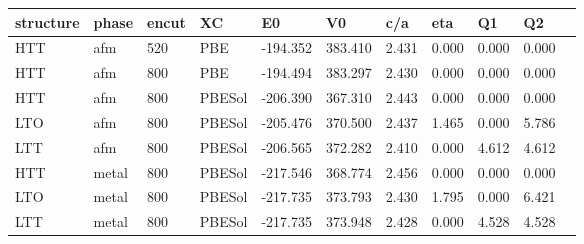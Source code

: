 \begin{tabular}{lllllllllll}
\toprule
structure &  phase & encut &      XC &       E0 &       V0 &    c/a &    eta &     Q1 &     Q2 \\
\midrule
      HTT &    afm &   520 &     PBE & -194.352 &  383.410 &  2.431 &  0.000 &  0.000 &  0.000 \\
      HTT &    afm &   800 &     PBE & -194.494 &  383.297 &  2.430 &  0.000 &  0.000 &  0.000 \\
      HTT &    afm &   800 &  PBESol & -206.390 &  367.310 &  2.443 &  0.000 &  0.000 &  0.000 \\
      LTO &    afm &   800 &  PBESol & -205.476 &  370.500 &  2.437 &  1.465 &  0.000 &  5.786 \\
      LTT &    afm &   800 &  PBESol & -206.565 &  372.282 &  2.410 &  0.000 &  4.612 &  4.612 \\
      HTT &  metal &   800 &  PBESol & -217.546 &  368.774 &  2.456 &  0.000 &  0.000 &  0.000 \\
      LTO &  metal &   800 &  PBESol & -217.735 &  373.793 &  2.430 &  1.795 &  0.000 &  6.421 \\
      LTT &  metal &   800 &  PBESol & -217.735 &  373.948 &  2.428 &  0.000 &  4.528 &  4.528 \\
\bottomrule
\end{tabular}
